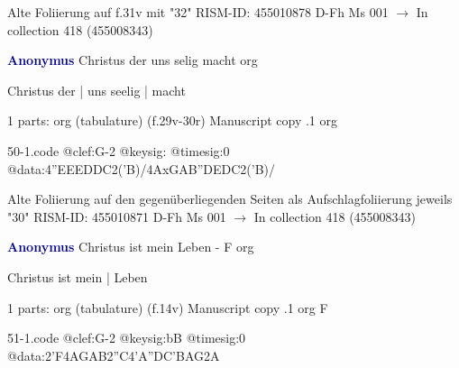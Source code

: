 \documentclass[twocolumn]{book}
\begin{document}
\newline Alte Foliierung auf f.31v mit "32"
\newline RISM-ID: 455010878
\newline D-Fh  Ms 001
\newline $\rightarrow$ In collection 418 (455008343)
      
\newline \par \vspace{7pt} \textcolor{darkblue}{\textbf{Anonymus  }}
\newline Christus der uns selig macht
\newline org
\newline \begin{itshape}[f.29v, at left:] Christus der | uns seelig | macht\end{itshape} 
\newline \textcolor{darkblue}{}  1 parts: org (tabulature)  (f.29v-30r)
\newline Manuscript copy
.1  org  
\begin{filecontents*}{50-1.code}
@clef:G-2
@keysig:
@timesig:0
@data:4''EEEDDC2('B)/4AxGAB''DEDC2('B)/
\end{filecontents*}
\newline
%

\newline Alte Foliierung auf den gegenüberliegenden Seiten als Aufschlagfoliierung jeweils "30"
\newline RISM-ID: 455010871
\newline D-Fh  Ms 001
\newline $\rightarrow$ In collection 418 (455008343)
      
\newline \par \vspace{7pt} \textcolor{darkblue}{\textbf{Anonymus  }}
\newline Christus ist mein Leben - F
\newline org
\newline \begin{itshape}[f.14v, at left:] Christus ist mein | Leben\end{itshape} 
\newline \textcolor{darkblue}{}  1 parts: org (tabulature)  (f.14v)
\newline Manuscript copy
.1  org  F  
\begin{filecontents*}{51-1.code}
@clef:G-2
@keysig:bB
@timesig:0
@data:2'F4AGAB2''C4'A''DC'BAG2A
\end{filecontents*}
\newline
%
\end{document}
